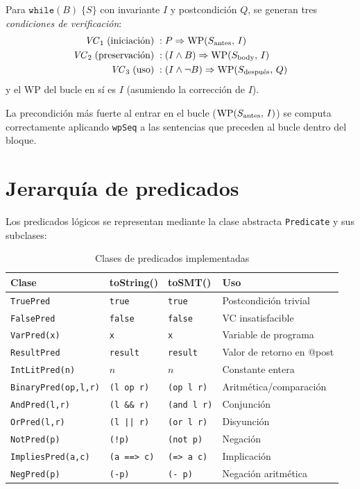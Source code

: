 \begin{regla}
  Para $\texttt{while}(B)\;\{S\}$ con invariante $I$ y postcondición $Q$,
  se generan tres \emph{condiciones de verificación}:
  \begin{align*}
    \mathit{VC}_1 \;(\text{iniciación})\; &: P \Rightarrow \mathrm{WP}(S_{\text{antes}},\,I) \\
    \mathit{VC}_2 \;(\text{preservación})\; &: (I \wedge B) \Rightarrow \mathrm{WP}(S_{\text{body}},\,I) \\
    \mathit{VC}_3 \;(\text{uso})\; &: (I \wedge \neg B) \Rightarrow \mathrm{WP}(S_{\text{después}},\,Q)
  \end{align*}
  y el WP del bucle en sí es $I$ (asumiendo la corrección de $I$).
\end{regla}

La precondición más fuerte al entrar en el bucle
($\mathrm{WP}(S_{\text{antes}},\,I)$) se computa correctamente aplicando
\texttt{wpSeq} a las sentencias que preceden al bucle dentro del bloque.

\section{Jerarquía de predicados}

Los predicados lógicos se representan mediante la clase abstracta
\texttt{Predicate} y sus subclases:

\begin{table}[H]
  \centering
  \caption{Clases de predicados implementadas}
  \label{tab:preds}
  \begin{tabular}{llll}
    \toprule
    \textbf{Clase}    & \textbf{toString()}      & \textbf{toSMT()} & \textbf{Uso} \\
    \midrule
    \texttt{TruePred}     & \texttt{true}        & \texttt{true}   & Postcondición trivial \\
    \texttt{FalsePred}    & \texttt{false}       & \texttt{false}  & VC insatisfacible \\
    \texttt{VarPred(x)}   & \texttt{x}           & \texttt{x}      & Variable de programa \\
    \texttt{ResultPred}   & \texttt{result}      & \texttt{result} & Valor de retorno en @post \\
    \texttt{IntLitPred(n)}& $n$                  & $n$             & Constante entera \\
    \texttt{BinaryPred(op,l,r)} & \texttt{(l op r)} & \texttt{(op l r)} & Aritmética/comparación \\
    \texttt{AndPred(l,r)} & \texttt{(l \&\& r)}  & \texttt{(and l r)} & Conjunción \\
    \texttt{OrPred(l,r)}  & \texttt{(l || r)}    & \texttt{(or l r)}  & Disyunción \\
    \texttt{NotPred(p)}   & \texttt{(!p)}        & \texttt{(not p)}   & Negación \\
    \texttt{ImpliesPred(a,c)} & \texttt{(a ==> c)} & \texttt{(=> a c)} & Implicación \\
    \texttt{NegPred(p)}   & \texttt{(-p)}        & \texttt{(- p)}  & Negación aritmética \\
    \bottomrule
  \end{tabular}
\end{table}

